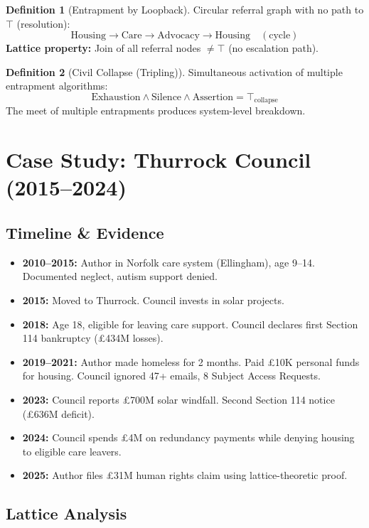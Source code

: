 \documentclass[11pt,a4paper]{article}
\theoremstyle{definition}
\newtheorem{definition}{Definition}
\begin{document}
\begin{definition}[Entrapment by Loopback]
Circular referral graph with no path to $\top$ (resolution):
\[
\text{Housing} \to \text{Care} \to \text{Advocacy} \to \text{Housing} \quad (\text{cycle})
\]
\textbf{Lattice property:} Join of all referral nodes $\neq \top$ (no escalation path).
\end{definition}

\begin{definition}[Civil Collapse (Tripling)]
Simultaneous activation of multiple entrapment algorithms:
\[
\text{Exhaustion} \wedge \text{Silence} \wedge \text{Assertion} = \top_{\text{collapse}}
\]
The meet of multiple entrapments produces system-level breakdown.
\end{definition}

\section{Case Study: Thurrock Council (2015--2024)}

\subsection{Timeline \& Evidence}

\begin{itemize}
    \item \textbf{2010--2015:} Author in Norfolk care system (Ellingham), age 9--14. Documented neglect, autism support denied.
    \item \textbf{2015:} Moved to Thurrock. Council invests in solar projects.
    \item \textbf{2018:} Age 18, eligible for leaving care support. Council declares first Section 114 bankruptcy (£434M losses).
    \item \textbf{2019--2021:} Author made homeless for 2 months. Paid £10K personal funds for housing. Council ignored 47+ emails, 8 Subject Access Requests.
    \item \textbf{2023:} Council reports £700M solar windfall. Second Section 114 notice (£636M deficit).
    \item \textbf{2024:} Council spends £4M on redundancy payments while denying housing to eligible care leavers.
    \item \textbf{2025:} Author files £31M human rights claim using lattice-theoretic proof.
\end{itemize}

\subsection{Lattice Analysis}
\end{document}

